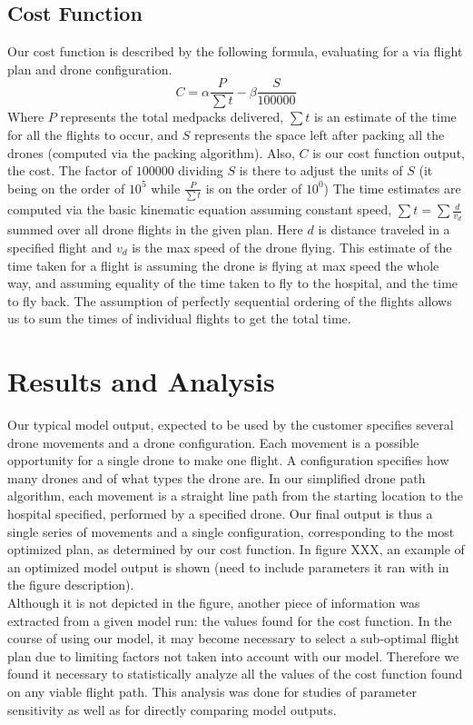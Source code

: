 \documentclass[twocolumn,10pt]{asme2ej}
\begin{document}
\subsection{Cost Function}
Our cost function is described by the following formula, evaluating for a via flight plan and drone configuration.
\[
C = \alpha \frac{P}{\sum{t}} - \beta \frac{S}{100000}
\]
Where $P$ represents the total medpacks delivered, $\sum{t}$ is an estimate of the time for all the flights to occur, and $S$ represents the space left after packing all the drones (computed via the packing algorithm). Also, $C$ is our cost function output, the cost. The factor of $100000$ dividing $S$ is there to adjust the units of $S$ (it being on the order of $10^5$ while $\frac{P}{\sum{t}}$ is on the order of $10^0$) The time estimates are computed via the basic kinematic equation assuming constant speed, $\sum{t}=\sum{\frac{d}{v_d}}$ summed over all drone flights in the given plan. Here $d$ is distance traveled in a specified flight and $v_d$ is the max speed of the drone flying. This estimate of the time taken for a flight is assuming the drone is flying at max speed the whole way, and assuming equality of the time taken to fly to the hospital, and the time to fly back. The assumption of perfectly sequential ordering of the flights allows us to sum the times of individual flights to get the total time.

\section{Results and Analysis}
Our typical model output, expected to be used by the customer specifies several drone movements and a drone configuration. Each movement is a possible opportunity for a single drone to make one flight. A configuration specifies how many drones and of what types the drone are. In our simplified drone path algorithm, each movement is a straight line path from the starting location to the hospital specified, performed by a specified drone. Our final output is thus a single series of movements and a single configuration, corresponding to the most optimized plan, as determined by our cost function. In figure XXX, an example of an optimized model output is shown (need to include parameters it ran with in the figure description). \\
Although it is not depicted in the figure, another piece of information was extracted from a given model run: the values found for the cost function. In the course of using our model, it may become necessary to select a sub-optimal flight plan due to limiting factors not taken into account with our model. Therefore we found it necessary to statistically analyze all the values of the cost function found on any viable flight path. This analysis was done for studies of parameter sensitivity as well as for directly comparing model outputs.
\end{document}
